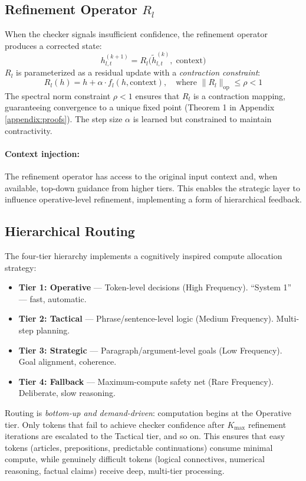 \documentclass[11pt,a4paper]{article}
\theoremstyle{definition}
\begin{document}
\subsection{Refinement Operator $R_l$}

When the checker signals insufficient confidence, the refinement operator produces a corrected state:
\[ h_{l,t}^{(k+1)} = R_l\bigl(\tilde{h}_{l,t}^{(k)},\; \text{context}\bigr) \]
$R_l$ is parameterized as a residual update with a \textit{contraction constraint}:
\[ R_l(h) = h + \alpha \cdot f_l(h, \text{context}), \quad \text{where } \|R_l\|_{\text{op}} \leq \rho < 1 \]
The spectral norm constraint $\rho < 1$ ensures that $R_l$ is a contraction mapping, guaranteeing convergence to a unique fixed point (Theorem 1 in Appendix \ref{appendix:proofs}). The step size $\alpha$ is learned but constrained to maintain contractivity.

\paragraph{Context injection:} The refinement operator has access to the original input context and, when available, top-down guidance from higher tiers. This enables the strategic layer to influence operative-level refinement, implementing a form of hierarchical feedback.

\subsection{Hierarchical Routing}

The four-tier hierarchy implements a cognitively inspired compute allocation strategy:
\begin{itemize}
    \item \textbf{Tier 1: Operative} --- Token-level decisions (High Frequency). ``System 1'' --- fast, automatic.
    \item \textbf{Tier 2: Tactical} --- Phrase/sentence-level logic (Medium Frequency). Multi-step planning.
    \item \textbf{Tier 3: Strategic} --- Paragraph/argument-level goals (Low Frequency). Goal alignment, coherence.
    \item \textbf{Tier 4: Fallback} --- Maximum-compute safety net (Rare Frequency). Deliberate, slow reasoning.
\end{itemize}
Routing is \textit{bottom-up and demand-driven}: computation begins at the Operative tier. Only tokens that fail to achieve checker confidence after $K_{\max}$ refinement iterations are escalated to the Tactical tier, and so on. This ensures that easy tokens (articles, prepositions, predictable continuations) consume minimal compute, while genuinely difficult tokens (logical connectives, numerical reasoning, factual claims) receive deep, multi-tier processing.
\end{document}
